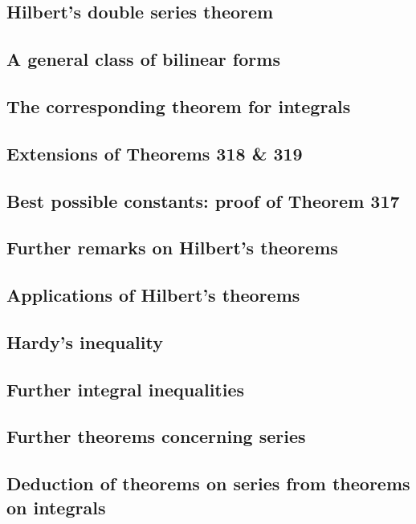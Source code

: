 \documentclass[oneside]{book}
\numberwithin{equation}{section}
\begin{document}
\subsection{Hilbert's double series theorem}

\subsection{A general class of bilinear forms}

\subsection{The corresponding theorem for integrals}

\subsection{Extensions of Theorems 318 \& 319}

\subsection{Best possible constants: proof of Theorem 317}

\subsection{Further remarks on Hilbert's theorems}

\subsection{Applications of Hilbert's theorems}

\subsection{Hardy's inequality}

\subsection{Further integral inequalities}

\subsection{Further theorems concerning series}

\subsection{Deduction of theorems on series from theorems on integrals}
\end{document}
